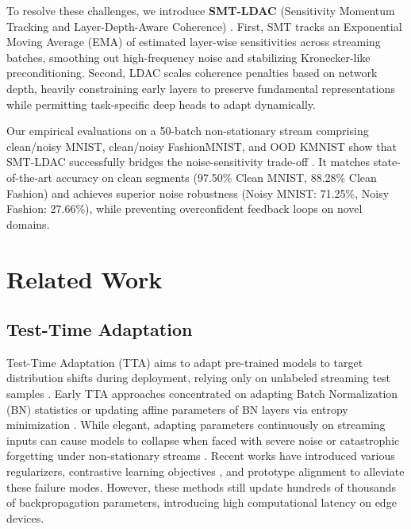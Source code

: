 \documentclass{article}
\theoremstyle{plain}
\theoremstyle{definition}
\theoremstyle{remark}
\begin{document}
To resolve these challenges, we introduce \textbf{SMT-LDAC} (Sensitivity Momentum Tracking and Layer-Depth-Aware Coherence) \cite{Cui2025OnlineTA, Guo2025EverythingTT}. First, SMT tracks an Exponential Moving Average (EMA) of estimated layer-wise sensitivities across streaming batches, smoothing out high-frequency noise and stabilizing Kronecker-like preconditioning. Second, LDAC scales coherence penalties based on network depth, heavily constraining early layers to preserve fundamental representations while permitting task-specific deep heads to adapt dynamically.

Our empirical evaluations on a 50-batch non-stationary stream comprising clean/noisy MNIST, clean/noisy FashionMNIST, and OOD KMNIST show that SMT-LDAC successfully bridges the noise-sensitivity trade-off \cite{Zhang2025MultiSourceDG, Marczak2025NoTL}. It matches state-of-the-art accuracy on clean segments (97.50\% Clean MNIST, 88.28\% Clean Fashion) and achieves superior noise robustness (Noisy MNIST: 71.25\%, Noisy Fashion: 27.66\%), while preventing overconfident feedback loops on novel domains.

\section{Related Work}
\label{sec:related}
\subsection{Test-Time Adaptation}
Test-Time Adaptation (TTA) aims to adapt pre-trained models to target distribution shifts during deployment, relying only on unlabeled streaming test samples \cite{Wang2021TentFT, Wu2025UnlockingEL}. Early TTA approaches concentrated on adapting Batch Normalization (BN) statistics \cite{Cheng2025WhoeverST} or updating affine parameters of BN layers via entropy minimization \cite{wang2021tent}. While elegant, adapting parameters continuously on streaming inputs can cause models to collapse when faced with severe noise or catastrophic forgetting under non-stationary streams \cite{Chen2025BringRT}. Recent works have introduced various regularizers, contrastive learning objectives \cite{Chen2022ContrastiveTA}, and prototype alignment \cite{Yuan2023RobustTA} to alleviate these failure modes. However, these methods still update hundreds of thousands of backpropagation parameters, introducing high computational latency on edge devices.
\end{document}

